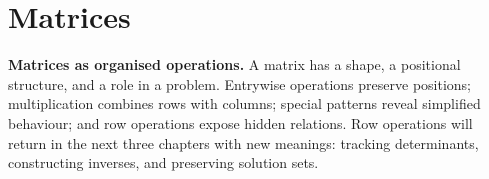 \chapter{Matrices}







\noindent\textbf{Matrices as organised operations.} A matrix has a shape, a positional structure, and a role in a problem. Entrywise operations preserve positions; multiplication combines rows with columns; special patterns reveal simplified behaviour; and row operations expose hidden relations. Row operations will return in the next three chapters with new meanings: tracking determinants, constructing inverses, and preserving solution sets.



